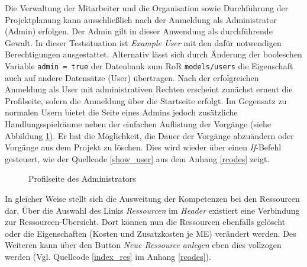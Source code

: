 \documentclass[a4paper,12pt,parskip,bibtotoc,liststotoc]{article}
\begin{document}
Die Verwaltung der Mitarbeiter und die Organisation sowie Durchführung der Projektplanung kann ausschließlich nach der Anmeldung als Administrator (Admin) erfolgen. Der Admin gilt in dieser Anwendung als durchführende Gewalt. In dieser Testsituation ist \textit{Example User} mit den dafür notwendigen Berechtigungen ausgestattet. Alternativ lässt sich durch Änderung der booleschen Variable \texttt{admin = true} der Datenbank zum RoR \texttt{models/users} die Eigenschaft auch auf andere Datensätze (User) übertragen. Nach der erfolgreichen Anmeldung als User mit administrativen Rechten erscheint zunächst erneut die Profilseite, sofern die Anmeldung über die Startseite erfolgt. Im Gegensatz zu normalen Usern bietet die Seite eines Admins jedoch zusätzliche Handlungsspielräume neben der einfachen Auflistung der Vorgänge (siehe Abbildung \ref{ProAd}). Er hat die Möglichkeit, die Dauer der Vorgänge abzuändern oder Vorgänge aus dem Projekt zu löschen. Dies wird wieder über einen \textit{If}-Befehl gesteuert, wie der Quellcode \ref{show_user} aus dem Anhang \ref{rcodes} zeigt.\\ \vspace{1cm} 

\begin{figure}[h!]
  \begin{center}
    \caption{Profilseite des Administrators}  \label{ProAd}
  \end{center}
\end{figure}       

In gleicher Weise stellt sich die Ausweitung der Kompetenzen bei den Ressourcen dar. Über die Auswahl des Links \textit{Ressourcen} im \textit{Header} existiert eine Verbindung zur Ressourcen-Übersicht. Dort können nun die Ressourcen ebenfalls gelöscht oder die Eigenschaften (Kosten und Zusatzkosten je ME) verändert werden. Des Weiteren kann über den Button \textit{Neue Ressource anlegen} eben dies vollzogen werden (Vgl. Quellcode \ref{index_res} im Anhang \ref{rcodes}).\\      
\end{document}
